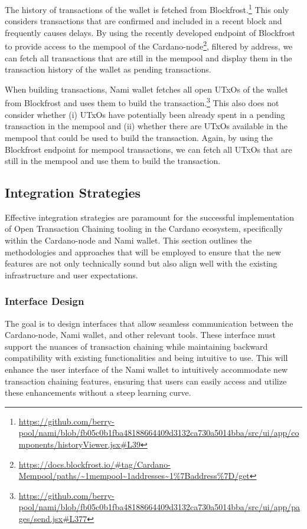 \documentclass[11pt]{article}
\begin{document}
The history of transactions of the wallet is fetched from Blockfrost.\footnote{\url{https://github.com/berry-pool/nami/blob/fb05c0b1fba48188664409d3132ca730a5014bba/src/ui/app/components/historyViewer.jsx\#L39}}
This only considers transactions that are confirmed and included in a recent block and frequently causes delays.
By using the recently developed endpoint of Blockfrost to provide access to the mempool of the Cardano-node\footnote{\url{https://docs.blockfrost.io/\#tag/Cardano-Mempool/paths/~1mempool~1addresses~1\%7Baddress\%7D/get}},
filtered by address, we can fetch all transactions that are still in the mempool and display them in the transaction history of the wallet as pending transactions.

When building transactions, Nami wallet fetches all open UTxOs of the wallet from Blockfrost
and uses them to build the transaction.\footnote{\url{https://github.com/berry-pool/nami/blob/fb05c0b1fba48188664409d3132ca730a5014bba/src/ui/app/pages/send.jsx\#L377}}
This also does not consider whether (i) UTxOs have potentially been already spent in a pending transaction in the mempool and
(ii) whether there are UTxOs available in the mempool that could be used to build the transaction.
Again, by using the Blockfrost endpoint for mempool transactions, we can fetch all UTxOs that are still in the mempool and use them to build the transaction.

\subsection{Integration Strategies}

Effective integration strategies are paramount for the successful implementation of Open Transaction Chaining tooling in the Cardano ecosystem,
specifically within the Cardano-node and Nami wallet.
This section outlines the methodologies and approaches that will be employed to ensure that the new features are not only technically sound but also align well with the existing infrastructure and user expectations.

\subsubsection{Interface Design}
The goal is to design interfaces that allow seamless communication between the Cardano-node, Nami wallet, and other relevant tools.
These interface must support the nuances of transaction chaining while maintaining backward compatibility with existing functionalities and being intuitive to use.
This will enhance the user interface of the Nami wallet to intuitively accommodate new transaction chaining features, ensuring that users can easily access and utilize these enhancements without a steep learning curve.
\end{document}

